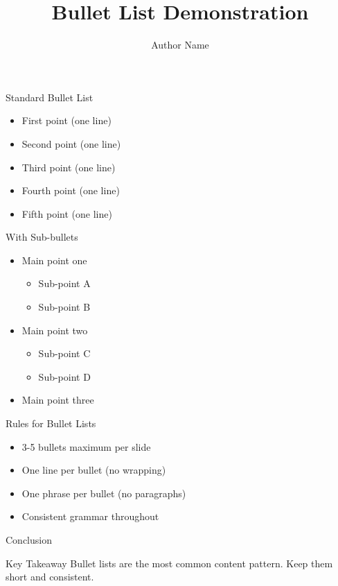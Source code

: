 \documentclass[10pt]{beamer}
\title[]{Bullet List Demonstration}
\author[]{Author Name}
\institute[]{Institution Name}
\date{}
\begin{document}
\begin{frame}
  \titlepage
\end{frame}

\begin{frame}{Standard Bullet List}
  \begin{itemize}
    \item First point (one line)
    \item Second point (one line)
    \item Third point (one line)
    \item Fourth point (one line)
    \item Fifth point (one line)
  \end{itemize}
\end{frame}

\begin{frame}{With Sub-bullets}
  \begin{itemize}
    \item Main point one
      \begin{itemize}
        \item Sub-point A
        \item Sub-point B
      \end{itemize}
    \item Main point two
      \begin{itemize}
        \item Sub-point C
        \item Sub-point D
      \end{itemize}
    \item Main point three
  \end{itemize}
\end{frame}

\begin{frame}{Rules for Bullet Lists}
  \begin{itemize}
    \item 3-5 bullets maximum per slide
    \item One line per bullet (no wrapping)
    \item One phrase per bullet (no paragraphs)
    \item Consistent grammar throughout
  \end{itemize}
\end{frame}

\begin{frame}{Conclusion}
  \begin{block}{Key Takeaway}
    Bullet lists are the most common content pattern. Keep them short and consistent.
  \end{block}
\end{frame}
\end{document}
